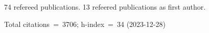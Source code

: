 74 refereed publications. 13 refeered publications as first author.

Total citations~=~3706; h-index~=~34 (2023-12-28)